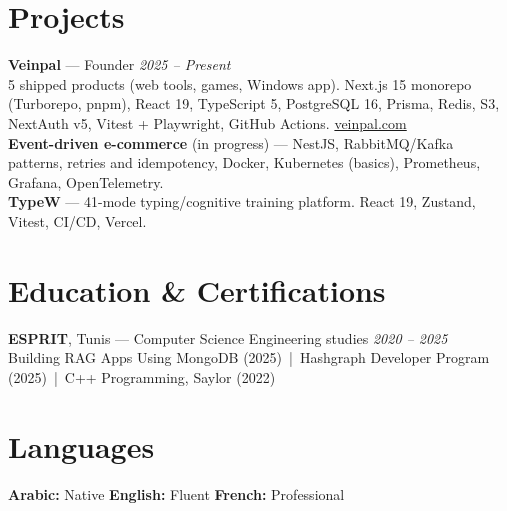 \documentclass[10pt,a4paper]{article}
\begin{document}
\section*{Projects}
{\small
\textbf{Veinpal} --- Founder \hfill {\color{gray}\textit{2025 -- Present}}\\
5 shipped products (web tools, games, Windows app). Next.js 15 monorepo (Turborepo, pnpm),
React 19, TypeScript 5, PostgreSQL 16, Prisma, Redis, S3, NextAuth v5, Vitest + Playwright,
GitHub Actions. \href{https://veinpal.com/apps}{veinpal.com}\\[2pt]
\textbf{Event-driven e-commerce} (in progress) --- NestJS, RabbitMQ/Kafka patterns,
retries and idempotency, Docker, Kubernetes (basics), Prometheus, Grafana, OpenTelemetry.\\[2pt]
\textbf{TypeW} --- 41-mode typing/cognitive training platform. React 19, Zustand,
Vitest, CI/CD, Vercel.
}

\section*{Education \& Certifications}
{\small
\textbf{ESPRIT}, Tunis --- Computer Science Engineering studies \hfill {\color{gray}\textit{2020 -- 2025}}\\[1pt]
Building RAG Apps Using MongoDB (2025) \,|\, Hashgraph Developer Program (2025) \,|\, C++ Programming, Saylor (2022)
}

\section*{Languages}
{\small \textbf{Arabic:} Native \quad \textbf{English:} Fluent \quad \textbf{French:} Professional}
\end{document}

